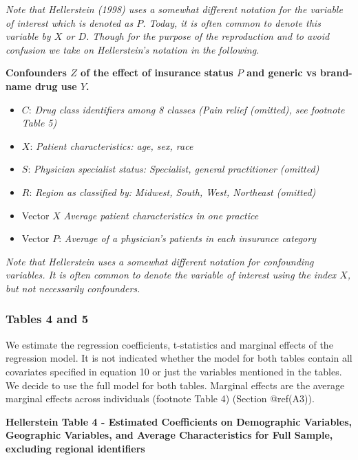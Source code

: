 \documentclass[
]{book}
\providecommand{\tightlist}{%
  \setlength{\itemsep}{0pt}\setlength{\parskip}{0pt}}
\begin{document}
\emph{Note that Hellerstein (1998) uses a somewhat different notation
for the variable of interest which is denoted as \(P\). Today, it is
often common to denote this variable by \(X\) or \(D\). Though for the
purpose of the reproduction and to avoid confusion we take on
Hellerstein's notation in the following.}

\textbf{Confounders \(Z\) of the effect of insurance status \(P\) and
generic vs brand-name drug use \(Y\).}

\begin{itemize}
\tightlist
\item
  \(C\): \emph{Drug class identifiers among 8 classes (Pain relief
  (omitted), see footnote Table 5)}
\item
  \(X\): \emph{Patient characteristics: age, sex, race}
\item
  \(S\): \emph{Physician specialist status: Specialist, general
  practitioner (omitted)}
\item
  \(R\): \emph{Region as classified by: Midwest, South, West, Northeast
  (omitted)}
\item
  Vector \(X\) \emph{Average patient characteristics in one practice}
\item
  Vector \(P\): \emph{Average of a physician's patients in each
  insurance category}
\end{itemize}

\emph{Note that Hellerstein uses a somewhat different notation for
confounding variables. It is often common to denote the variable of
interest using the index \(X\), but not necessarily confounders.}

\hypertarget{tables-4-and-5}{%
\subsubsection{Tables 4 and 5}\label{tables-4-and-5}}

We estimate the regression coefficients, t-statistics and marginal
effects of the regression model. It is not indicated whether the model
for both tables contain all covariates specified in equation 10 or just
the variables mentioned in the tables. We decide to use the full model
for both tables. Marginal effects are the average marginal effects
across individuals (footnote Table 4) (Section @ref(A3)).

\textbf{Hellerstein Table 4 - Estimated Coefficients on Demographic
Variables, Geographic Variables, and Average Characteristics for Full
Sample, excluding regional identifiers}
\end{document}
